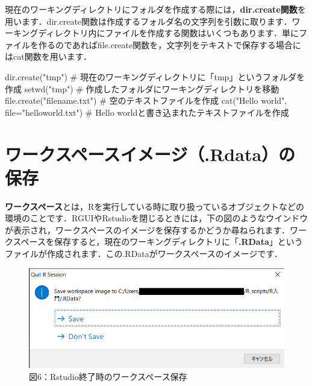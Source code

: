\documentclass[
  letterpaper,
  DIV=11,
  numbers=noendperiod]{scrreprt}
\newenvironment{Shaded}{\begin{snugshade}}{\end{snugshade}}
\newcommand{\AttributeTok}[1]{\textcolor[rgb]{0.40,0.45,0.13}{#1}}
\newcommand{\CommentTok}[1]{\textcolor[rgb]{0.37,0.37,0.37}{#1}}
\newcommand{\FunctionTok}[1]{\textcolor[rgb]{0.28,0.35,0.67}{#1}}
\newcommand{\NormalTok}[1]{\textcolor[rgb]{0.00,0.23,0.31}{#1}}
\newcommand{\StringTok}[1]{\textcolor[rgb]{0.13,0.47,0.30}{#1}}
\begin{document}
現在のワーキングディレクトリにフォルダを作成する際には，\textbf{dir.create関数}を用います．dir.create関数は作成するフォルダ名の文字列を引数に取ります．ワーキングディレクトリ内にファイルを作成する関数はいくつもあります．単にファイルを作るのであればfile.create関数を，文字列をテキストで保存する場合にはcat関数を用います．

\begin{Shaded}
\begin{Highlighting}[]
\FunctionTok{dir.create}\NormalTok{(}\StringTok{"tmp"}\NormalTok{) }\CommentTok{\# 現在のワーキングディレクトリに「tmp」というフォルダを作成}
\FunctionTok{setwd}\NormalTok{(}\StringTok{"tmp"}\NormalTok{) }\CommentTok{\# 作成したフォルダにワーキングディレクトリを移動}
\FunctionTok{file.create}\NormalTok{(}\StringTok{"filename.txt"}\NormalTok{) }\CommentTok{\# 空のテキストファイルを作成}
\FunctionTok{cat}\NormalTok{(}\StringTok{"Hello world"}\NormalTok{, }\AttributeTok{file=}\StringTok{"helloworld.txt"}\NormalTok{) }\CommentTok{\# Hello worldと書き込まれたテキストファイルを作成}
\end{Highlighting}
\end{Shaded}

\hypertarget{ux30efux30fcux30afux30b9ux30daux30fcux30b9ux30a4ux30e1ux30fcux30b8.rdataux306eux4fddux5b58}{%
\section{ワークスペースイメージ（.Rdata）の保存}\label{ux30efux30fcux30afux30b9ux30daux30fcux30b9ux30a4ux30e1ux30fcux30b8.rdataux306eux4fddux5b58}}

\textbf{ワークスペース}とは，Rを実行している時に取り扱っているオブジェクトなどの環境のことです．RGUIやRstudioを閉じるときには，下の図のようなウインドウが表示され，ワークスペースのイメージを保存するかどうか尋ねられます．ワークスペースを保存すると，現在のワーキングディレクトリに「\textbf{.RData}」というファイルが作成されます．この.RDataがワークスペースのイメージです．

\begin{figure}

{\centering \includegraphics{././image/save_workspace.png}

}

\caption{図6：Rstudio終了時のワークスペース保存}

\end{figure}
\end{document}
